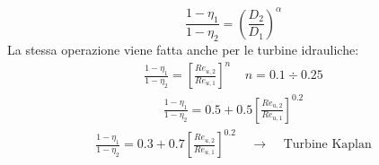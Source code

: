 \begin{equation}
\frac{1-\eta_1}{1-\eta_2} = \left( \frac{D_2}{D_1}\right)^\alpha
\end{equation}
La stessa operazione viene fatta anche per le turbine idrauliche:
\begin{align*}
\frac{1-\eta_1}{1-\eta_2} = \left[ \frac{Re_{u,2}}{Re_{u,1}} \right]^n \;\;\;\; n=0.1 \div 0.25
\end{align*}
\begin{align*}
\frac{1-\eta_1}{1-\eta_2} =0.5 + 0.5 \left[ \frac{Re_{u,2}}{Re_{u,1}} \right]^{0.2}
\end{align*}
\begin{align*}
\frac{1-\eta_1}{1-\eta_2} = 0.3 + 0.7 \left[ \frac{Re_{u,2}}{Re_{u,1}} \right]^{0.2} \;\;\;\; \to \;\;\;\; \mbox{Turbine Kaplan}
\end{align*}
